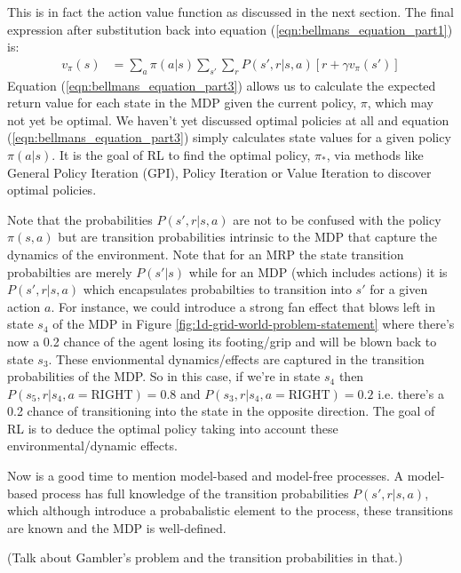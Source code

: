 \documentclass[a4paper,11pt]{article}
\begin{document}
This is in fact the action value function as discussed in the next section.  The final expression after substitution back into equation (\ref{eqn:bellmans_equation_part1}) is:
\begin{equation} \label{eqn:bellmans_equation_part3}
\begin{split}
        v_\pi (s) &= \sum_{a} \pi(a|s) \sum_{s'} \sum_r P(s',r|s,a) [r + \gamma v_{\pi}(s')]
\end{split}
\end{equation}
Equation (\ref{eqn:bellmans_equation_part3}) allows us to calculate the expected return value for each state in the MDP given the current policy, $\pi$, which may not yet be optimal.  We haven't yet discussed optimal policies at all and equation (\ref{eqn:bellmans_equation_part3}) simply calculates state values for a given policy $\pi(a|s)$.  It is the goal of RL to find the optimal policy, $\pi_*$, via methods like General Policy Iteration (GPI), Policy Iteration or Value Iteration to discover optimal policies.

Note that the probabilities $P(s',r|s,a)$ are not to be confused with the policy $\pi(s,a)$ but are transition probabilities intrinsic to the MDP that capture the dynamics of the environment.  Note that for an MRP the state transition probabilties are merely $P(s'|s)$ while for an MDP (which includes actions) it is $P(s',r|s,a)$ which encapsulates probabilties to transition into $s'$ for a given action $a$.  For instance, we could introduce a strong fan effect that blows left in state $s_4$ of the MDP in Figure \ref{fig:1d-grid-world-problem-statement} where there's now a 0.2 chance of the agent losing its footing/grip and will be blown back to state $s_3$.  These envionmental dynamics/effects are captured in the transition probabilities of the MDP.  So in this case, if we're in state $s_4$ then $P(s_5,r|s_4, a=\text{RIGHT}) = 0.8$ and $P(s_3,r|s_4, a=\text{RIGHT}) = 0.2$ i.e. there's a 0.2 chance of transitioning into the state in the opposite direction.  The goal of RL is to deduce the optimal policy taking into account these environmental/dynamic effects.

Now is a good time to mention model-based and model-free processes.  A model-based process has full knowledge of the transition probabilities $P(s',r|s,a)$, which although introduce a probabalistic element to the process, these transitions are known and the MDP is well-defined.  

(Talk about Gambler's problem and the transition probabilities in that.)
\end{document}
